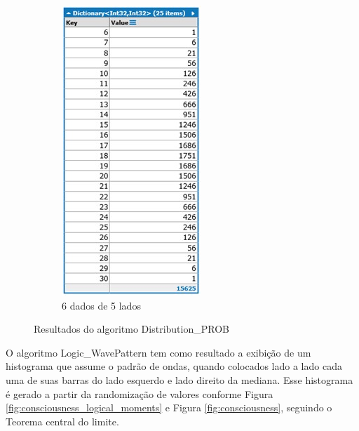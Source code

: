 \begin{apendicesenv}
\begin{figure}[H]
\begin{subfigure}[H]{0.47\linewidth}
	\includegraphics[width=.72\linewidth]{sections/images/Distribution_PROB_6_5.jpg}
	\caption{6 dados de 5 lados}
	\label{fig:Distribution_PROB_6_5}
	\end{subfigure}%
\caption{Resultados do algoritmo Distribution\_PROB}

\end{figure}

O algoritmo Logic\_WavePattern tem como resultado a exibição de um histograma que assume o padrão de ondas, quando colocados lado a lado cada uma de suas barras do lado esquerdo e lado direito da mediana. Esse histograma é gerado a partir da randomização de valores conforme Figura \ref{fig:consciousness_logical_moments} e Figura \ref{fig:consciousness}, seguindo o Teorema central do limite.


\end{apendicesenv}
